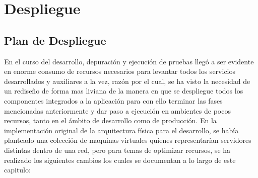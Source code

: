 
\chapter{Despliegue}
\label{capitulo6}

\section{Plan de Despliegue}
En el curso del desarrollo, depuración y ejecución de pruebas llegó a ser evidente en enorme consumo de recursos necesarios para levantar todos los servicios desarrollados y auxiliares a la vez, razón por el cual, se ha visto la necesidad de un rediseño de forma mas liviana de la manera en que se despliegue todos los componentes integrados a la aplicación para con ello terminar las fases mencionadas anteriormente y dar paso a ejecución en ambientes de pocos recursos, tanto en el ámbito de desarrollo como de producción. En la implementación original de la arquitectura física para el desarrollo, se había planteado una colección de maquinas virtuales quienes representarían servidores distintas dentro de una red, pero para temas de optimizar recursos, se ha realizado los siguientes cambios los cuales se documentan a lo largo de este capitulo:

